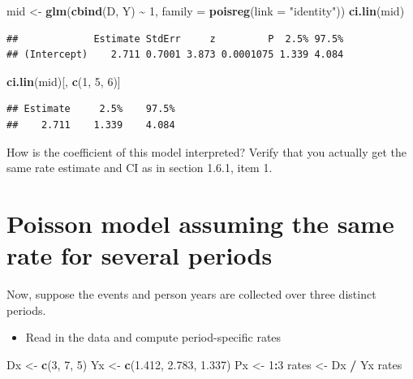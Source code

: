 \documentclass[
]{book}
\newenvironment{Shaded}{\begin{snugshade}}{\end{snugshade}}
\newcommand{\AttributeTok}[1]{\textcolor[rgb]{0.13,0.29,0.53}{#1}}
\newcommand{\DecValTok}[1]{\textcolor[rgb]{0.00,0.00,0.81}{#1}}
\newcommand{\FloatTok}[1]{\textcolor[rgb]{0.00,0.00,0.81}{#1}}
\newcommand{\FunctionTok}[1]{\textcolor[rgb]{0.13,0.29,0.53}{\textbf{#1}}}
\newcommand{\NormalTok}[1]{#1}
\newcommand{\OtherTok}[1]{\textcolor[rgb]{0.56,0.35,0.01}{#1}}
\newcommand{\SpecialCharTok}[1]{\textcolor[rgb]{0.81,0.36,0.00}{\textbf{#1}}}
\newcommand{\StringTok}[1]{\textcolor[rgb]{0.31,0.60,0.02}{#1}}
\providecommand{\tightlist}{%
  \setlength{\itemsep}{0pt}\setlength{\parskip}{0pt}}
\theoremstyle{definition}
\theoremstyle{definition}
\theoremstyle{definition}
\theoremstyle{definition}
\theoremstyle{remark}
\begin{document}
\begin{Shaded}
\begin{Highlighting}[]
\NormalTok{mid }\OtherTok{\textless{}{-}} \FunctionTok{glm}\NormalTok{(}\FunctionTok{cbind}\NormalTok{(D, Y) }\SpecialCharTok{\textasciitilde{}} \DecValTok{1}\NormalTok{, }\AttributeTok{family =} \FunctionTok{poisreg}\NormalTok{(}\AttributeTok{link =} \StringTok{"identity"}\NormalTok{))}
\FunctionTok{ci.lin}\NormalTok{(mid)}
\end{Highlighting}
\end{Shaded}

\begin{verbatim}
##             Estimate StdErr     z         P  2.5% 97.5%
## (Intercept)    2.711 0.7001 3.873 0.0001075 1.339 4.084
\end{verbatim}

\begin{Shaded}
\begin{Highlighting}[]
\FunctionTok{ci.lin}\NormalTok{(mid)[, }\FunctionTok{c}\NormalTok{(}\DecValTok{1}\NormalTok{, }\DecValTok{5}\NormalTok{, }\DecValTok{6}\NormalTok{)]}
\end{Highlighting}
\end{Shaded}

\begin{verbatim}
## Estimate     2.5%    97.5% 
##    2.711    1.339    4.084
\end{verbatim}

How is the coefficient of this model interpreted?
Verify that you actually get the same rate estimate and CI as in section 1.6.1, item 1.

\section{Poisson model assuming the same rate for several periods}\label{poisson-model-assuming-the-same-rate-for-several-periods}

Now, suppose the events and person years are collected over three distinct periods.

\begin{itemize}
\tightlist
\item
  Read in the data and compute period-specific rates
\end{itemize}

\begin{Shaded}
\begin{Highlighting}[]
\NormalTok{Dx }\OtherTok{\textless{}{-}} \FunctionTok{c}\NormalTok{(}\DecValTok{3}\NormalTok{, }\DecValTok{7}\NormalTok{, }\DecValTok{5}\NormalTok{)}
\NormalTok{Yx }\OtherTok{\textless{}{-}} \FunctionTok{c}\NormalTok{(}\FloatTok{1.412}\NormalTok{, }\FloatTok{2.783}\NormalTok{, }\FloatTok{1.337}\NormalTok{)}
\NormalTok{Px }\OtherTok{\textless{}{-}} \DecValTok{1}\SpecialCharTok{:}\DecValTok{3}
\NormalTok{rates }\OtherTok{\textless{}{-}}\NormalTok{ Dx }\SpecialCharTok{/}\NormalTok{ Yx}
\NormalTok{rates}
\end{Highlighting}
\end{Shaded}
\end{document}
